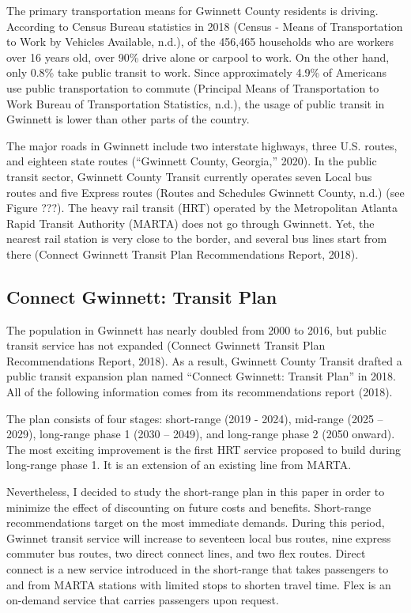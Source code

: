 \documentclass[
]{article}
\begin{document}
The primary transportation means for Gwinnett County residents is
driving. According to Census Bureau statistics in 2018 (Census - Means
of Transportation to Work by Vehicles Available, n.d.), of the 456,465
households who are workers over 16 years old, over 90\% drive alone or
carpool to work. On the other hand, only 0.8\% take public transit to
work. Since approximately 4.9\% of Americans use public transportation
to commute (Principal Means of Transportation to Work \textbar{} Bureau
of Transportation Statistics, n.d.), the usage of public transit in
Gwinnett is lower than other parts of the country.

The major roads in Gwinnett include two interstate highways, three U.S.
routes, and eighteen state routes (``Gwinnett County, Georgia,'' 2020).
In the public transit sector, Gwinnett County Transit currently operates
seven Local bus routes and five Express routes (Routes and Schedules
\textbar{} Gwinnett County, n.d.) (see Figure ???). The heavy rail
transit (HRT) operated by the Metropolitan Atlanta Rapid Transit
Authority (MARTA) does not go through Gwinnett. Yet, the nearest rail
station is very close to the border, and several bus lines start from
there (Connect Gwinnett Transit Plan Recommendations Report, 2018).

\hypertarget{connect-gwinnett-transit-plan}{%
\subsection{Connect Gwinnett: Transit
Plan}\label{connect-gwinnett-transit-plan}}

The population in Gwinnett has nearly doubled from 2000 to 2016, but
public transit service has not expanded (Connect Gwinnett Transit Plan
Recommendations Report, 2018). As a result, Gwinnett County Transit
drafted a public transit expansion plan named ``Connect Gwinnett:
Transit Plan'' in 2018. All of the following information comes from its
recommendations report (2018).

The plan consists of four stages: short-range (2019 - 2024), mid-range
(2025 -- 2029), long-range phase 1 (2030 -- 2049), and long-range phase
2 (2050 onward). The most exciting improvement is the first HRT service
proposed to build during long-range phase 1. It is an extension of an
existing line from MARTA.

Nevertheless, I decided to study the short-range plan in this paper in
order to minimize the effect of discounting on future costs and
benefits. Short-range recommendations target on the most immediate
demands. During this period, Gwinnet transit service will increase to
seventeen local bus routes, nine express commuter bus routes, two direct
connect lines, and two flex routes. Direct connect is a new service
introduced in the short-range that takes passengers to and from MARTA
stations with limited stops to shorten travel time. Flex is an on-demand
service that carries passengers upon request.
\end{document}
